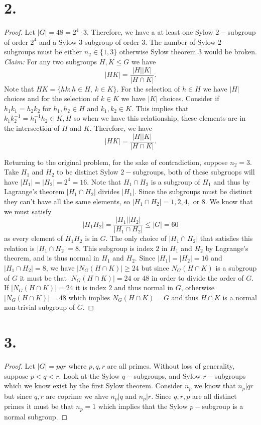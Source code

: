 \documentclass{article}
\begin{document}
\section*{2.}
\begin{proof}
    Let $|G| = 48 = 2^4\cdot 3$. Therefore, we have a at least one Sylow $2-$subgroup of order $2^4$ and a Sylow $3$-subgroup of order $3$. The number of Sylow $2-$subgroups must be either $n_2 \in \{1,3\}$ otherwise Sylow theorem $3$ would be broken. \\

    \textit{Claim:} For any two subgroups $H, K \leq G$ we have 
    \[
    |HK| = \frac{|H||K|}{|H \cap K|}.    
    \]
    Note that $HK = \{hk : h \in H, \ k \in K\}$. For the selection of $h \in H$ we have $|H|$ choices and for the selection of $k \in K$ we have $|K|$ choices. Consider if $h_1k_1 = h_2k_2$ for $h_1, h_2 \in H$ and $k_1, k_2 \in K$. This implies that $k_1k_2^{-1} = h_1^{-1}h_2 \in K, H$ so when we have this relationship, these elements are in the intersection of $H$ and $K$. Therefore, we have 
    \[
    |HK| = \frac{|H||K|}{|H \cap K|}.    
    \]

    Returning to the original problem, for the sake of contradiction, suppose $n_2 = 3$. Take $H_1$ and $H_2$ to be distinct Sylow $2-$subgroups, both of these subgruops will have $|H_1| = |H_2| = 2^4 = 16$. Note that $H_1 \cap H_2$ is a subgroup of $H_1$ and thus by Lagrange's theorem $|H_1 \cap H_2|$ divides $|H_1|$. Since the subgroups must be distinct they can't have all the same elements, so $|H_1 \cap H_2| = 1, 2, 4, \text{ or }8$. We know that we must satisfy 
    \[
    |H_1H_2| = \frac{|H_1||H_2|}{|H_1 \cap H_2|} \leq |G| = 60    
    \]
    as every element of $H_1H_2$ is in $G$. The only choice of $|H_1 \cap H_2|$ that satisfies this relation is $|H_1 \cap H_2| = 8$. This subgroup is index $2$ in $H_1$ and $H_2$ by Lagrange's theorem, and is thus normal in $H_1$ and $H_2$. Since $|H_1| = |H_2| = 16$ and $|H_1 \cap H_2| = 8$, we have $|N_G(H\cap K)| \geq 24$ but since $N_G(H \cap K)$ is a subgroup of $G$ it must be that $|N_G(H \cap K)| = 24 \text{ or } 48$ in order to divide the order of $G$. If $|N_G( H \cap K)| =  24$ it  is index $2$ and thus normal in $G$, otherwise $|N_G(H \cap K)| = 48 $ which implies $N_G(H \cap K) = G$ and thus $H \cap K$ is a normal non-trivial subgroup of $G$.  
\end{proof}

\section*{3.}
\begin{proof}
    Let $|G| = pqr$ where $p, q, r$ are all primes. Without loss of generality, suppose $p < q < r$. Look at the Sylow $q-$subgroups, and Sylow $r-$subgroups which we know exist by the first Sylow theorem. Consider $n_p$ we know that $n_p|qr$ but since $q, r$ are coprime we ahve $n_p|q$ and $n_p|r$. Since $q, r, p$ are all distinct primes it must be that $n_p = 1$ which implies that the Sylow $p-$subgroup is a normal subgroup.  
\end{proof}
\end{document}
